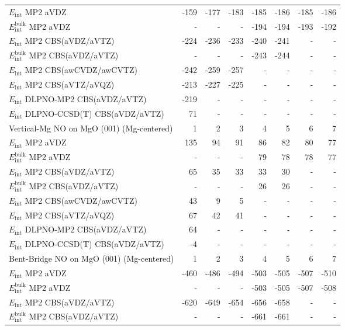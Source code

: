 \begin{longtable}{lrrrrrrr}
\midrule
$E_\textrm{int}$ MP2 aVDZ & -159 & -177 & -183 & -185 & -186 & -185 & -186 \\
$E_\textrm{int}^\textrm{bulk}$ MP2 aVDZ & - & - & - & -194 & -194 & -193 & -192 \\
$E_\textrm{int}$ MP2 CBS(aVDZ/aVTZ) & -224 & -236 & -233 & -240 & -241 & - & - \\
$E_\textrm{int}^\textrm{bulk}$ MP2 CBS(aVDZ/aVTZ) & - & - & - & -243 & -244 & - & - \\
$E_\textrm{int}$ MP2 CBS(awCVDZ/awCVTZ) & -242 & -259 & -257 & - & - & - & - \\
$E_\textrm{int}$ MP2 CBS(aVTZ/aVQZ) & -213 & -227 & -225 & - & - & - & - \\
$E_\textrm{int}$ DLPNO-MP2 CBS(aVDZ/aVTZ) & -219 & - & - & - & - & - & - \\
$E_\textrm{int}$ DLPNO-CCSD(T) CBS(aVDZ/aVTZ) & 71 & - & - & - & - & - & - \\
\toprule
Vertical-Mg NO on MgO (001) (Mg-centered) & 1 & 2 & 3 & 4 & 5 & 6 & 7 \\ 
\midrule
$E_\textrm{int}$ MP2 aVDZ & 135 & 94 & 91 & 86 & 82 & 80 & 77 \\
$E_\textrm{int}^\textrm{bulk}$ MP2 aVDZ & - & - & - & 79 & 78 & 78 & 77 \\
$E_\textrm{int}$ MP2 CBS(aVDZ/aVTZ) & 65 & 35 & 33 & 33 & 30 & - & - \\
$E_\textrm{int}^\textrm{bulk}$ MP2 CBS(aVDZ/aVTZ) & - & - & - & 26 & 26 & - & - \\
$E_\textrm{int}$ MP2 CBS(awCVDZ/awCVTZ) & 43 & 9 & 5 & - & - & - & - \\
$E_\textrm{int}$ MP2 CBS(aVTZ/aVQZ) & 67 & 42 & 41 & - & - & - & - \\
$E_\textrm{int}$ DLPNO-MP2 CBS(aVDZ/aVTZ) & 64 & - & - & - & - & - & - \\
$E_\textrm{int}$ DLPNO-CCSD(T) CBS(aVDZ/aVTZ) & -4 & - & - & - & - & - & - \\
\toprule
Bent-Bridge NO on MgO (001) (Mg-centered) & 1 & 2 & 3 & 4 & 5 & 6 & 7 \\ 
\midrule
$E_\textrm{int}$ MP2 aVDZ & -460 & -486 & -494 & -503 & -505 & -507 & -510 \\
$E_\textrm{int}^\textrm{bulk}$ MP2 aVDZ & - & - & - & -503 & -505 & -507 & -508 \\
$E_\textrm{int}$ MP2 CBS(aVDZ/aVTZ) & -620 & -649 & -654 & -656 & -658 & - & - \\
$E_\textrm{int}^\textrm{bulk}$ MP2 CBS(aVDZ/aVTZ) & - & - & - & -661 & -661 & - & - \\

\end{longtable}
